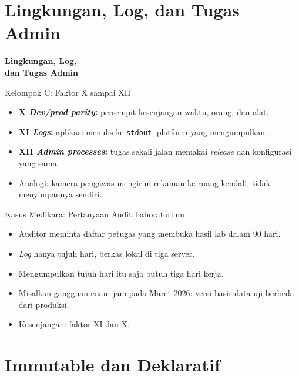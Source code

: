 \documentclass[aspectratio=169, table, 12pt]{beamer}
\begin{document}
\section{Lingkungan, Log, dan Tugas Admin}

\begin{frame}{\hfill}
  \centering
  \Huge{\textbf{Lingkungan, Log,\\dan Tugas Admin}}
\end{frame}

\begin{frame}{{\Large Kelompok C: Faktor X sampai XII}}
  \vspace{10pt}
  \begin{itemize}
    \item \textbf{X \textit{Dev/prod parity}:} persempit kesenjangan waktu, orang,
          dan alat.
    \item \textbf{XI \textit{Logs}:} aplikasi menulis ke \texttt{stdout}, platform
          yang mengumpulkan.
    \item \textbf{XII \textit{Admin processes}:} tugas sekali jalan memakai
          \textit{release} dan konfigurasi yang sama.
    \item Analogi: kamera pengawas mengirim rekaman ke ruang kendali, tidak
          menyimpannya sendiri.
  \end{itemize}
\end{frame}

\begin{frame}{{\Large Kasus Medikara: Pertanyaan Audit Laboratorium}}
  \vspace{10pt}
  \begin{itemize}
    \item Auditor meminta daftar petugas yang membuka hasil lab dalam 90 hari.
    \item \textit{Log} hanya tujuh hari, berkas lokal di tiga server.
    \item Mengumpulkan tujuh hari itu saja butuh tiga hari kerja.
    \item Misalkan gangguan enam jam pada Maret 2026: versi basis data uji berbeda
          dari produksi.
    \item Kesenjangan: faktor XI dan X.
  \end{itemize}
\end{frame}

\section{Immutable dan Deklaratif}
\end{document}
